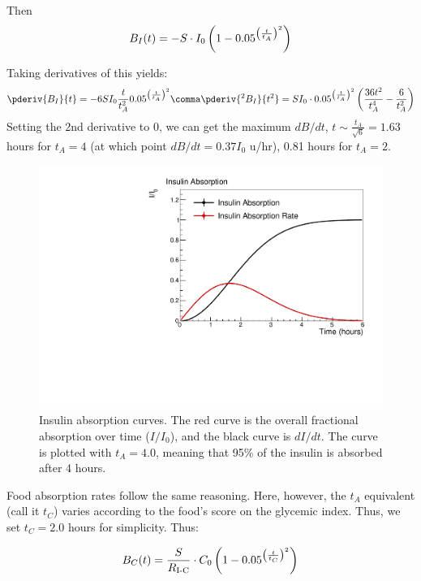 Then
\begin{equation}
{B_I}(t) = -S\cdot I_0\left( 1 - 0.05^{\left({t\over{t_A}}\right)^2} \right)
\label{eq:insulin}
\end{equation}

Taking derivatives of this yields:
\begin{equation}
\pderiv{B_I}{t} = -6SI_0\frac t{t_A^2} 0.05^{\left(\frac t{t_A}\right)^2}
\comma
\pderiv{^2 B_I}{t^2} = SI_0\cdot0.05^{\left(\frac t{t_A}\right)^2}\left({36t^2\over t_A^4} - {6\over t_A^2} \right)
\end{equation}
Setting the 2nd derivative to 0, we can get the maximum $dB/dt$, $t\sim \frac {t_A}{\sqrt{6}}=1.63$ 
hours for $t_A=4$ (at which point $dB/dt=0.37I_0$ u/hr), 0.81 hours for $t_A=2$.

\begin{figure}[htbp]
\begin{center}
\includegraphics[width=4.5in]{figures/absorption.pdf}
\caption{Insulin absorption curves. The red curve is the overall fractional absorption over time 
($I/I_0$), and the black curve is $dI/dt$. The curve is plotted with $t_A=4.0$, meaning that 95\% of 
the insulin is absorbed after 4 hours.}
\label{default}
\end{center}
\end{figure}

Food absorption rates follow the same reasoning. Here, however, the $t_A$  equivalent (call it $t_C$) 
varies according to the food's score on the glycemic index. Thus, we set $t_C=2.0$ hours for 
simplicity. Thus:

\begin{equation}
{B_C}(t) = {S\over R_\text{I-C}}\cdot C_0\left( 1 - 0.05^{\left({t\over{t_C}}\right)^2} \right)
\label{eq:carb}
\end{equation}

